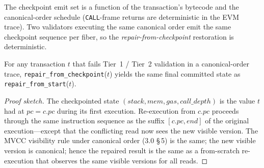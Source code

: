 The checkpoint emit set is a function of the transaction's bytecode
and the canonical-order schedule (\texttt{CALL}-frame returns are
deterministic in the EVM trace). Two validators executing the same
canonical order emit the same checkpoint sequence per fiber, so the
\emph{repair-from-checkpoint} restoration is deterministic.

\begin{lemma}
\label{lem:checkpoint-det}
For any transaction $t$ that fails Tier~1 / Tier~2 validation in a
canonical-order trace, \texttt{repair\_from\_checkpoint}($t$) yields
the same final committed state as \texttt{repair\_from\_start}($t$).
\end{lemma}
\begin{proof}[Proof sketch]
The checkpointed state $(\mathit{stack}, \mathit{mem}, \mathit{gas},
\mathit{call\_depth})$ is the value $t$ had at $\mathit{pc}=c.\mathit{pc}$
during its first execution. Re-execution from $c.\mathit{pc}$ proceeds
through the same instruction sequence as the suffix
$[c.\mathit{pc}, \mathit{end}]$ of the original execution---except
that the conflicting read now sees the new visible version. The MVCC
visibility rule under canonical order (3.0 \S\,5) is the same; the
new visible version is canonical; hence the repaired result is the
same as a from-scratch re-execution that observes the same visible
versions for all reads.
\end{proof}

